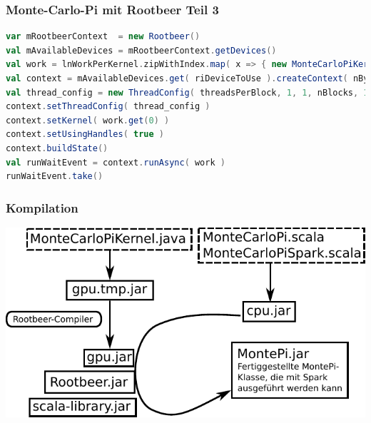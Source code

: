 \begin{frame}[fragile]
    \frametitle{Monte-Carlo-Pi mit Rootbeer Teil 3}
    \begin{lstlisting}[language=scala]
var mRootbeerContext  = new Rootbeer()
val mAvailableDevices = mRootbeerContext.getDevices()
val work = lnWorkPerKernel.zipWithIndex.map( x => { new MonteCarloPiKernel( lnHits(iGpu), lnIterations(iGpu), seed, nIterations ) } )
val context = mAvailableDevices.get( riDeviceToUse ).createContext( nBytesMemoryNeeded )
val thread_config = new ThreadConfig( threadsPerBlock, 1, 1, nBlocks, 1, work.size );
context.setThreadConfig( thread_config )
context.setKernel( work.get(0) )
context.setUsingHandles( true )
context.buildState()
val runWaitEvent = context.runAsync( work )
runWaitEvent.take()
\end{lstlisting}\vspace{-1.5\baselineskip}
\end{frame}

\begin{frame}
    \frametitle{Kompilation}
    \centerline{\includegraphics[width=1.0\linewidth]{compile-structure-deu-new-shorter.pdf}}
\end{frame}


